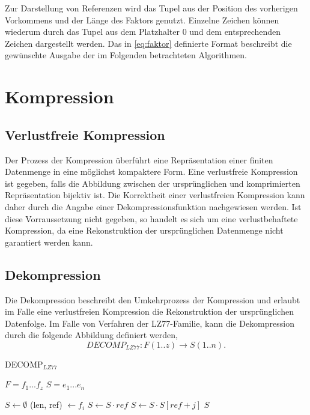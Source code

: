 Zur Darstellung von Referenzen wird das Tupel aus der Position des vorherigen Vorkommens und der Länge des Faktors genutzt. Einzelne Zeichen können wiederum durch das Tupel aus dem 
Platzhalter $0$ und dem entsprechenden Zeichen dargestellt werden. Das in \ref{eq:faktor} definierte Format beschreibt die gewünschte Ausgabe der im Folgenden betrachteten Algorithmen.

\section{Kompression} \label{comp}

\subsection{Verlustfreie Kompression}
Der Prozess der Kompression überführt eine Repräsentation einer finiten Datenmenge in eine möglichst kompaktere Form. Eine verlustfreie Kompression ist gegeben, falls die Abbildung
zwischen der ursprünglichen und komprimierten Repräsentation bijektiv ist. Die Korrektheit einer verlustfreien Kompression kann daher durch die Angabe einer Dekompressionsfunktion 
nachgewiesen werden. Ist diese Vorraussetzung nicht gegeben, so handelt es sich um eine verlustbehaftete Kompression, da eine Rekonstruktion der ursprünglichen Datenmenge nicht 
garantiert werden kann.

\subsection{Dekompression}
Die Dekompression beschreibt den Umkehrprozess der Kompression und erlaubt im Falle eine verlustfreien Kompression die Rekonstruktion der ursprünglichen Datenfolge. Im Falle von 
Verfahren der LZ77-Familie, kann die Dekompression durch die folgende Abbildung definiert werden, 
\begin{equation}
    DECOMP_{LZ77}: F(1..z) \rightarrow S(1..n).
\end{equation}

\begin{algorithm} [ht]
\centering
\caption{DECOMP$_{LZ77}$} \label{alg:decomp}
\algorithmicrequire $F=f_1...f_z$
\algorithmicensure $S=e_1...e_n$
\begin{algorithmic} [1]
    \STATE $S \gets \emptyset$
        \STATE (len, ref) $\gets f_i$
            \STATE $S \gets S \cdot ref$
        \ELSE
                \STATE $S \gets S \cdot S[ref + j]$
            \ENDFOR
        \ENDIF
    \ENDFOR
    \RETURN $S$
\end{algorithmic}
\end{algorithm}

